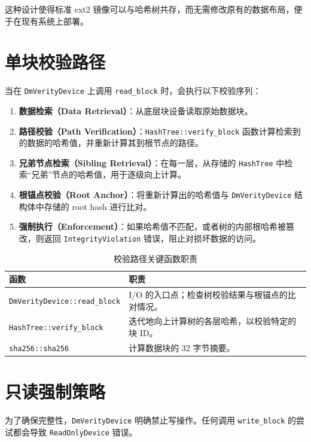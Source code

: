 这种设计使得标准 ext2 镜像可以与哈希树共存，而无需修改原有的数据布局，便于在现有系统上部署。

\section{单块校验路径}

当在 \texttt{DmVerityDevice} 上调用 \texttt{read\_block} 时，会执行以下校验序列：

\begin{enumerate}
    \item \textbf{数据检索（Data Retrieval）}：从底层块设备读取原始数据块。
    \item \textbf{路径校验（Path Verification）}：\texttt{HashTree::verify\_block} 函数计算检索到的数据的哈希值，并重新计算其到根节点的路径。
    \item \textbf{兄弟节点检索（Sibling Retrieval）}：在每一层，从存储的 \texttt{HashTree} 中检索“兄弟”节点的哈希值，用于逐级向上计算。
    \item \textbf{根锚点校验（Root Anchor）}：将重新计算出的哈希值与 \texttt{DmVerityDevice} 结构体中存储的 root hash 进行比对。
    \item \textbf{强制执行（Enforcement）}：如果哈希值不匹配，或者树的内部根哈希被篡改，则返回 \texttt{IntegrityViolation} 错误，阻止对损坏数据的访问。
\end{enumerate}

\begin{table}[H]
    \centering
    \caption{校验路径关键函数职责}
    \label{tab:verity_functions}
    \begin{tabular}{p{}p{}}
        \toprule
        \textbf{函数} & \textbf{职责} \\
        \midrule
        \texttt{DmVerityDevice::read\_block} & I/O 的入口点；检查树校验结果与根锚点的比对情况。 \\
        \texttt{HashTree::verify\_block} & 迭代地向上计算树的各层哈希，以校验特定的块 ID。 \\
        \texttt{sha256::sha256} & 计算数据块的 32 字节摘要。 \\
        \bottomrule
    \end{tabular}
\end{table}

\section{只读强制策略}

为了确保完整性，\texttt{DmVerityDevice} 明确禁止写操作。任何调用 \texttt{write\_block} 的尝试都会导致 \texttt{ReadOnlyDevice} 错误。

